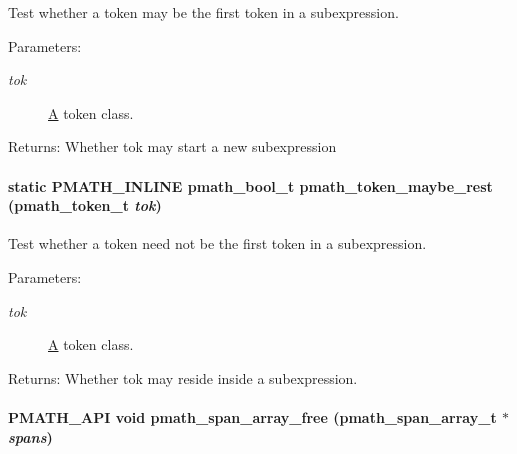 Test whether a token may be the first token in a subexpression. 

\begin{Desc}
\item[Parameters:]
\begin{description}
\item[{\em tok}]\hyperlink{class_a}{A} token class. \end{description}
\end{Desc}
\begin{Desc}
\item[Returns:]Whether tok may start a new subexpression \end{Desc}
\hypertarget{group__parser_g8e0466acaa70f215fa799cc547eadac4}{
\paragraph[{pmath\_\-token\_\-maybe\_\-rest}]{\setlength{\rightskip}{0pt plus 5cm}static PMATH\_\-INLINE {\bf pmath\_\-bool\_\-t} pmath\_\-token\_\-maybe\_\-rest ({\bf pmath\_\-token\_\-t} {\em tok})}\hfill}
\label{group__parser_g8e0466acaa70f215fa799cc547eadac4}


Test whether a token need not be the first token in a subexpression. 

\begin{Desc}
\item[Parameters:]
\begin{description}
\item[{\em tok}]\hyperlink{class_a}{A} token class. \end{description}
\end{Desc}
\begin{Desc}
\item[Returns:]Whether tok may reside inside a subexpression. \end{Desc}
\hypertarget{group__parser_gceb05ef4c39c239d68f39e3b9bde5f1e}{
\paragraph[{pmath\_\-span\_\-array\_\-free}]{\setlength{\rightskip}{0pt plus 5cm}PMATH\_\-API void pmath\_\-span\_\-array\_\-free ({\bf pmath\_\-span\_\-array\_\-t} $\ast$ {\em spans})}\hfill}
\label{group__parser_gceb05ef4c39c239d68f39e3b9bde5f1e}



